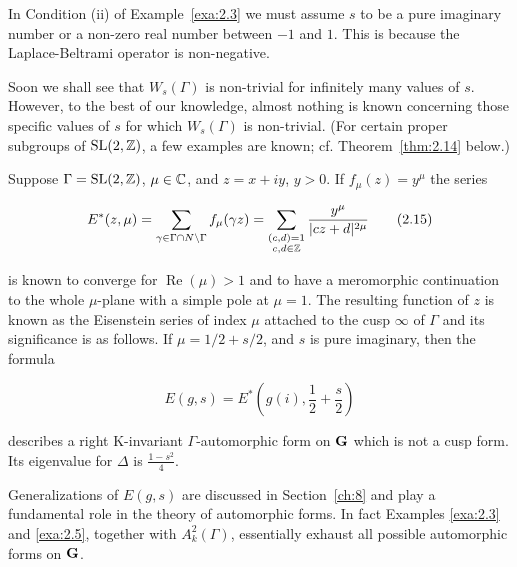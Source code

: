 \begin{remark}\label{rem:2.4}

In Condition (ii) of Example~\ref{exa:2.3} we must assume $s$ to be a pure imaginary number or a non-zero real number between $-1$ and $1$. This is because the Laplace-Beltrami operator is non-negative.

\end{remark}

Soon we shall see that $W_s(\Gamma)$ is non-trivial for infinitely many values of $s$. However, to the best of our knowledge, almost nothing is known concerning those specific values of $s$ for which $W_s(\Gamma)$ is non-trivial. (For certain proper subgroups of $\operatorname{SL}(2,\mathbb{Z})$, a few examples are known; cf. Theorem~\ref{thm:2.14} below.)

\begin{example}\label{exa:2.5}

Suppose $\Gamma = \operatorname{SL}(2,\mathbb{Z})$, $\mu \in \mathbb{C}$, and $z = x + iy$, $y > 0$. If $f_{\mu}(z) = y^{\mu}$ the series

\begin{equation}\label{eq:2.15}
E^{*}(z,\mu) = \sum_{\gamma \in \Gamma \cap N \backslash \Gamma} f_{\mu}(\gamma z) = \sum_{\substack{(c,d) = 1 \\ c,d \in \mathbb{Z}}} \frac{y^{\mu}}{|cz + d|^{2\mu}}\tag{2.15}
\end{equation}

is known to converge for $\operatorname{Re}(\mu) > 1$ and to have a meromorphic continuation to the whole $\mu$-plane with a simple pole at $\mu = 1$. The resulting function of $z$ is known as the Eisenstein series of index $\mu$ attached to the cusp $\infty$ of $\Gamma$ and its significance is as follows. If $\mu = 1/2 + s/2$, and $s$ is pure imaginary, then the formula

\begin{equation}\label{eq:2.16}
E(g, s) = E^{*}\left(g(i), \frac{1}{2} + \frac{s}{2}\right)\tag{2.16}
\end{equation}

describes a right K-invariant $\Gamma$-automorphic form on $\mathbf{G}$ which is not a cusp form. Its eigenvalue for $\Delta$ is $\frac{1 - s^2}{4}$.

\end{example}

Generalizations of $E(g,s)$ are discussed in Section~\ref{ch:8} and play a fundamental role in the theory of automorphic forms. In fact Examples \ref{exa:2.3} and \ref{exa:2.5}, together with $A_k^2(\Gamma)$, essentially exhaust all possible automorphic forms on $\mathbf{G}$.

